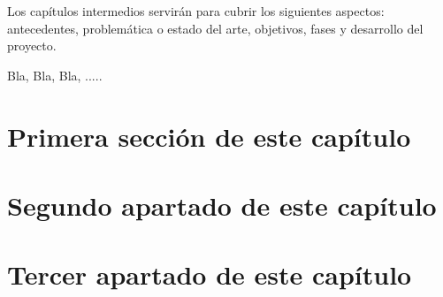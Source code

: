 Los capítulos intermedios servirán para cubrir los siguientes aspectos: antecedentes, problemática o estado del arte, objetivos, fases y desarrollo del proyecto.

\bigskip
Bla, Bla, Bla, .....

\section{Primera sección de este capítulo}
\section{Segundo apartado de este capítulo}
\section{Tercer apartado de este capítulo}
